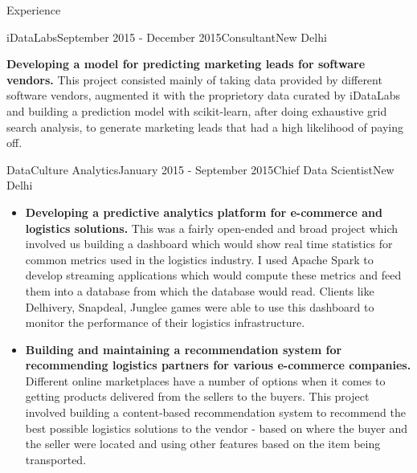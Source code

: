 \documentclass{resume} %
\begin{document}
\begin{rSection}{Experience}
\begin{rSubsection}{iDataLabs}{September 2015 - December 2015}{Consultant}{New Delhi}
\item \textbf{Developing a model for predicting marketing leads for software vendors.}
    This project consisted mainly of taking data provided by different software
    vendors, augmented it with the proprietory data curated by iDataLabs and
    building a prediction model with scikit-learn, after doing exhaustive grid
    search analysis, to generate marketing leads that had a high likelihood of
    paying off.

\end{rSubsection}

\begin{rSubsection}{DataCulture Analytics}{January 2015 - September 2015}{Chief
    Data Scientist}{New Delhi}
\begin{itemize}
\item \textbf{Developing a predictive analytics platform for e-commerce and logistics solutions.}
    This was a fairly open-ended and broad project which involved us building a
    dashboard which would show real time statistics for common metrics used in
    the logistics industry. I used Apache Spark to develop streaming
    applications which would compute these metrics and feed them into a
    database from which the database would read. Clients like Delhivery,
    Snapdeal, Junglee games were able to use this dashboard to monitor the
    performance of their logistics infrastructure.
\item \textbf{Building and maintaining a recommendation system for recommending logistics partners for various e-commerce companies.}
    Different online marketplaces have a number of options when it comes to
    getting products delivered from the sellers to the buyers. This project
    involved building a content-based recommendation system to recommend the
    best possible logistics solutions to the vendor - based on where the buyer
    and the seller were located and using other features based on the item
    being transported.

\end{itemize}
\end{rSubsection}


\end{rSection}
\end{document}
